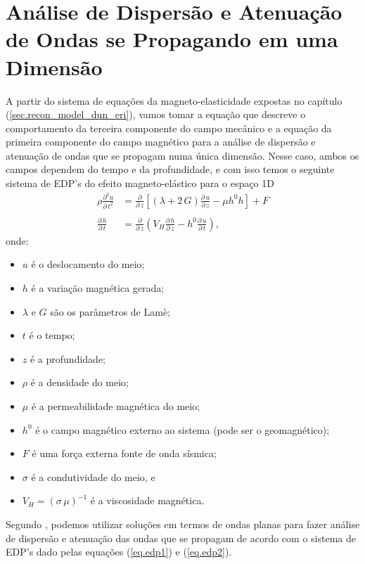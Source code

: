 \section{An\'alise de Dispers\~ao e Atenua\c{c}\~ao de Ondas se Propagando em uma Dimens\~ao}\label{sec.dispesion_1D}

A partir do sistema de equa\c{c}\~oes da magneto-elasticidade expostas no cap\'itulo (\ref{sec.recon_model_dun_eri}), vamos tomar a equa\c{c}\~ao que descreve o comportamento da terceira componente do campo mec\^anico e a equa\c{c}\~ao da primeira componente do campo magn\'etico para a an\'alise de dispers\~ao e atenua\c{c}\~ao de ondas que se propagam numa \'unica dimens\~ao. Nesse caso, ambos os campos dependem do tempo e da profundidade, e com isso temos o seguinte sistema de EDP's do efeito magneto-el\'astico para o espa\c{c}o 1D 
\begin{align}\label{eq.edp1}
\rho\frac{\partial^2u}{\partial\,t^2}&=\frac{\partial}{\partial\,z}\left[(\lambda+2\,G)\frac{\partial\,u}{\partial\,z}-\mu h^0h\right]+F\\\nonumber\\\label{eq.edp2}
\frac{\partial\,h}{\partial\,t}&=\frac{\partial}{\partial\,z}\left(V_H\frac{\partial\,h}{\partial\,z}-h^0\frac{\partial\,u}{\partial\,t}\right),
\end{align}
onde:
\begin{itemize}
\item $u$ \'e o deslocamento do meio;
\item $h$ \'e a varia\c{c}\~ao magn\'etica gerada;
\item $\lambda$ e $G$ s\~ao os par\^ametros de Lam\`e;
\item $t$ \'e o tempo;
\item $z$ \'e a profundidade;
\item $\rho$ \'e a densidade do meio;
\item $\mu$ \'e a permeabilidade magn\'etica do meio;
\item $h^0$ \'e o campo magn\'etico externo ao sistema (pode ser o geomagn\'etico);
\item $F$ \'e uma for\c{c}a externa fonte de onda s\'ismica;
\item $\sigma$ \'e a condutividade do meio, e
\item $V_H=(\sigma\,\mu)^{-1}$ \'e a viscosidade magn\'etica.
\end{itemize}

Segundo \cite{Blanc_13}, podemos utilizar solu\c{c}\~oes em termos de ondas planas para fazer an\'alise de dispers\~ao e atenua\c{c}\~ao das ondas que se propagam de acordo com o sistema de EDP's dado pelas equa\c{c}\~oes (\ref{eq.edp1}) e (\ref{eq.edp2}).

